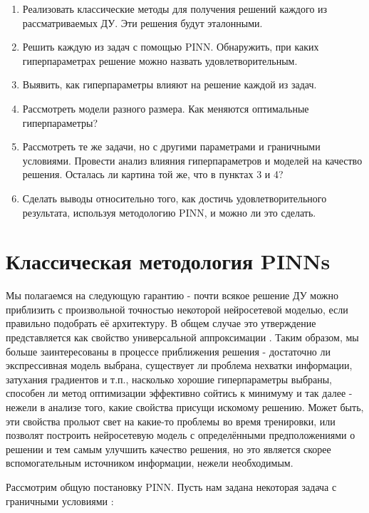 \documentclass[a4paper, 12pt]{article}
\begin{document}
\begin{enumerate}
    \item Реализовать классические методы для получения решений каждого из рассматриваемых ДУ. Эти решения будут эталонными.
    \item Решить каждую из задач с помощью PINN. Обнаружить, при каких гиперпараметрах решение можно назвать удовлетворительным.
    \item Выявить, как гиперпараметры влияют на решение каждой из задач.
    \item Рассмотреть модели разного размера. Как меняются оптимальные гиперпараметры?
    \item Рассмотреть те же задачи, но с другими параметрами и граничными условиями. Провести анализ влияния гиперпараметров и моделей на качество решения. Осталась ли картина той же, что в пунктах 3 и 4?
    \item Сделать выводы относительно того, как достичь удовлетворительного результата, используя методологию PINN, и можно ли это сделать.
\end{enumerate}

\section{Классическая методология PINNs} \label{section:pinn}

Мы полагаемся на следующую гарантию - почти всякое решение ДУ можно приблизить с произвольной точностью некоторой нейросетевой моделью, если правильно подобрать её архитектуру. В общем случае это утверждение представляется как свойство универсальной аппроксимации \cite{Kratsios2021}. Таким образом, мы больше заинтересованы в процессе приближения решения - достаточно ли экспрессивная модель выбрана, существует ли проблема нехватки информации, затухания градиентов и т.п., насколько хорошие гиперпараметры выбраны, способен ли метод оптимизации эффективно сойтись к минимуму и так далее - нежели в анализе того, какие свойства присущи искомому решению. Может быть, эти свойства прольют свет на какие-то проблемы во время тренировки, или позволят построить нейросетевую модель с определёнными предположениями о решении и тем самым улучшить качество решения, но это является скорее вспомогательным источником информации, нежели необходимым.

Рассмотрим общую постановку PINN. Пусть нам задана некоторая задача с граничными условиями \cite{Cuomo2022}:
\end{document}
